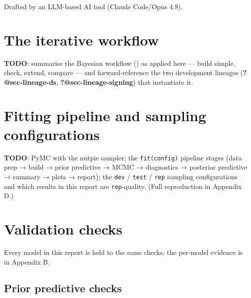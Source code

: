 \documentclass[
  11pt,
  a4paper,
]{report}
\begin{document}
\hfill\break

\begin{tcolorbox}[enhanced jigsaw, arc=.35mm, bottomrule=.15mm, bottomtitle=1mm, breakable, colback=white, colbacktitle=quarto-callout-note-color!10!white, colframe=quarto-callout-note-color-frame, coltitle=black, left=2mm, leftrule=.75mm, opacityback=0, opacitybacktitle=0.6, rightrule=.15mm, title=\textcolor{quarto-callout-note-color}{\faInfo}\hspace{0.5em}{Note}, titlerule=0mm, toprule=.15mm, toptitle=1mm]

Drafted by an LLM-based AI tool (Claude Code/Opus 4.8).

\end{tcolorbox}

\section{The iterative workflow}\label{the-iterative-workflow}

\textbf{TODO}: summarise the Bayesian workflow
() as applied here --- build simple, check, extend, compare --- and
forward-reference the two development lineages
(\textbf{?@sec-lineage-ds}, \textbf{?@sec-lineage-signing}) that
instantiate it.

\section{Fitting pipeline and sampling
configurations}\label{fitting-pipeline-and-sampling-configurations}

\textbf{TODO}: PyMC with the nutpie sampler; the \texttt{fit(config)}
pipeline stages (data prep → build → prior predictive → MCMC →
diagnostics → posterior predictive → summary → plots → report); the
\texttt{dev} / \texttt{test} / \texttt{rep} sampling configurations and
which results in this report are \texttt{rep}-quality. (Full
reproduction in Appendix D.)

\section{Validation checks}\label{validation-checks}

Every model in this report is held to the same checks; the per-model
evidence is in Appendix B.

\subsection{Prior predictive checks}\label{prior-predictive-checks}
\end{document}
